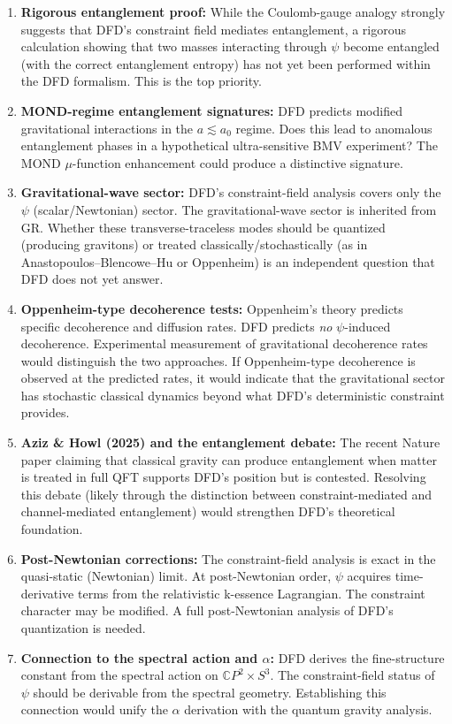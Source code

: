 \documentclass[12pt,a4paper]{article}
\begin{document}
\begin{enumerate}
\item \textbf{Rigorous entanglement proof:} While the Coulomb-gauge analogy strongly suggests that DFD's constraint field mediates entanglement, a rigorous calculation showing that two masses interacting through $\psi$ become entangled (with the correct entanglement entropy) has not yet been performed within the DFD formalism. This is the top priority.

\item \textbf{MOND-regime entanglement signatures:} DFD predicts modified gravitational interactions in the $a \lesssim a_0$ regime. Does this lead to anomalous entanglement phases in a hypothetical ultra-sensitive BMV experiment? The MOND $\mu$-function enhancement could produce a distinctive signature.

\item \textbf{Gravitational-wave sector:} DFD's constraint-field analysis covers only the $\psi$ (scalar/Newtonian) sector. The gravitational-wave sector is inherited from GR. Whether these transverse-traceless modes should be quantized (producing gravitons) or treated classically/stochastically (as in Anastopoulos--Blencowe--Hu or Oppenheim) is an independent question that DFD does not yet answer.

\item \textbf{Oppenheim-type decoherence tests:} Oppenheim's theory predicts specific decoherence and diffusion rates. DFD predicts \emph{no} $\psi$-induced decoherence. Experimental measurement of gravitational decoherence rates would distinguish the two approaches. If Oppenheim-type decoherence is observed at the predicted rates, it would indicate that the gravitational sector has stochastic classical dynamics beyond what DFD's deterministic constraint provides.

\item \textbf{Aziz \& Howl (2025) and the entanglement debate:} The recent Nature paper claiming that classical gravity can produce entanglement when matter is treated in full QFT supports DFD's position but is contested. Resolving this debate (likely through the distinction between constraint-mediated and channel-mediated entanglement) would strengthen DFD's theoretical foundation.

\item \textbf{Post-Newtonian corrections:} The constraint-field analysis is exact in the quasi-static (Newtonian) limit. At post-Newtonian order, $\psi$ acquires time-derivative terms from the relativistic k-essence Lagrangian. The constraint character may be modified. A full post-Newtonian analysis of DFD's quantization is needed.

\item \textbf{Connection to the spectral action and $\alpha$:} DFD derives the fine-structure constant from the spectral action on $\mathbb{C}P^2 \times S^3$. The constraint-field status of $\psi$ should be derivable from the spectral geometry. Establishing this connection would unify the $\alpha$ derivation with the quantum gravity analysis.
\end{enumerate}
\end{document}
